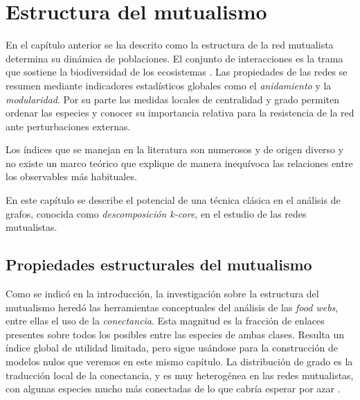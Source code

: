 
\chapter{Estructura del mutualismo} %
\label{chapterESTATICA}  %


En el capítulo anterior se ha descrito como la estructura de la red mutualista determina su dinámica de poblaciones. El conjunto de interacciones es la trama que sostiene la biodiversidad de los ecosistemas \cite{mccann2007protecting}.
Las propiedades de las redes se resumen mediante indicadores estadísticos globales como el \textit{anidamiento}
y la \textit{modularidad}. Por su parte las medidas locales de centralidad y grado permiten ordenar las especies y conocer su importancia relativa para la resistencia de la red ante perturbaciones externas. 

Los índices que se manejan en la literatura son numerosos y de origen diverso y no existe un marco teórico que explique de manera inequívoca las relaciones entre los observables más habituales.

En este capítulo se describe el potencial de una técnica clásica en el análisis de grafos, conocida como \textit{descomposición k-core}, en el estudio de las redes mutualistas.


\section{Propiedades estructurales del mutualismo}
\label{sec:prop_mutualismo}

Como se indicó en la introducción, la investigación sobre la estructura del mutualismo heredó las herramientas conceptuales del análisis de las \textit{food webs}, entre ellas el uso de la \textit{conectancia}. Esta magnitud es la fracción de enlaces presentes sobre todos los posibles entre las especies de ambas clases. Resulta un índice global de utilidad limitada, pero sigue
usándose para la construcción de modelos nulos que veremos en este mismo capítulo. La distribución de grado es la traducción local de la conectancia,
y es muy heterogénea en las redes mutualistas, con algunas especies mucho más conectadas de lo que cabría esperar por azar \cite{jordano2003invariant}.

